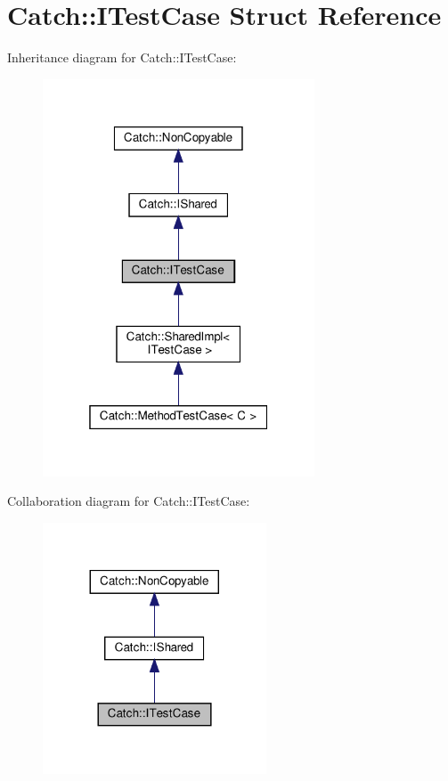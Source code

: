 \hypertarget{structCatch_1_1ITestCase}{}\section{Catch\+:\+:I\+Test\+Case Struct Reference}
\label{structCatch_1_1ITestCase}


Inheritance diagram for Catch\+:\+:I\+Test\+Case\+:\nopagebreak
\begin{figure}[H]
\begin{center}
\leavevmode
\includegraphics[width=229pt]{structCatch_1_1ITestCase__inherit__graph}
\end{center}
\end{figure}


Collaboration diagram for Catch\+:\+:I\+Test\+Case\+:\nopagebreak
\begin{figure}[H]
\begin{center}
\leavevmode
\includegraphics[width=188pt]{structCatch_1_1ITestCase__coll__graph}
\end{center}
\end{figure}
